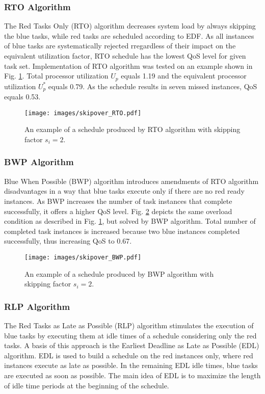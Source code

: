 \subsubsection{RTO Algorithm}
The Red Tasks Only (RTO) algorithm decreases system load by always skipping the blue tasks, while red tasks are scheduled according to EDF. 
As all instances of blue tasks are systematically rejected rregardless of their impact on the equivalent utilization factor, RTO schedule has the lowest QoS level for given task set.
Implementation of RTO algorithm was tested on an example shown in 
Fig. \ref{rto}.
Total processor utilization $U_p$ equals 1.19 and the equivalent processor 
utilization $U_p^\ast$ equals 0.79.
As the schedule results in seven missed instances, QoS equals 0.53. 
\\
\begin{figure}[ht]
    \centering
    \texttt{[image: images/skipover\_RTO.pdf]}
    \caption{An example of a schedule produced by RTO algorithm with skipping factor $s_i=2$.}
    \label{rto}
\end{figure}

\subsubsection{BWP Algorithm}
Blue When Possible (BWP) algorithm introduces amendments of RTO algorithm disadvantages in a way that blue tasks execute only if there are no red ready instances.
As BWP increases the number of task instances that complete successfully, it offers a higher QoS level. 
Fig. \ref{bwp} depicts the same overload condition as described in Fig. 
\ref{rto}, but solved by BWP algorithm. 
Total number of completed task instances is increased because two blue instances completed successfully, thus increasing QoS to 0.67.
\\
\begin{figure}[ht]
    \centering
    \texttt{[image: images/skipover\_BWP.pdf]}
    \caption{An example of a schedule produced by BWP algorithm with skipping factor $s_i=2$.}
    \label{bwp}
\end{figure}

\subsubsection{RLP Algorithm}
The Red Tasks as Late as Possible (RLP) algorithm stimulates the execution of blue tasks by executing them at idle times of a schedule considering only the red tasks. 
A basis of this approach is the Earliest Deadline as Late as Possible (EDL) algorithm. 
EDL is used to build a schedule on the red instances only, where red instances execute as late as possible. 
In the remaining EDL idle times, blue tasks are executed as soon as possible. 
The main idea of EDL is to maximize the length of idle time periods at the beginning of the schedule. 

